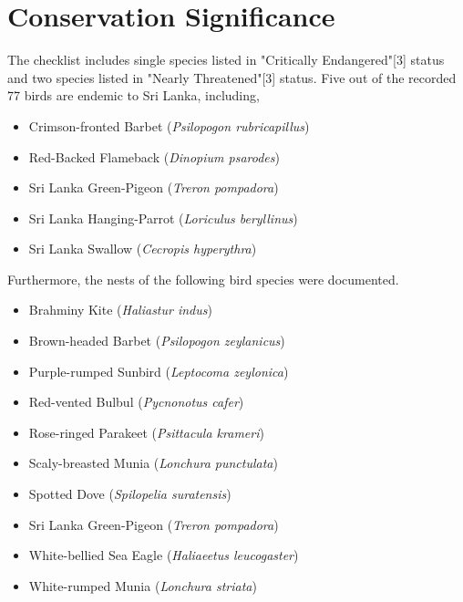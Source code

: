 \section{Conservation Significance}
The checklist includes single species listed in "Critically Endangered"[3] status and two species listed in "Nearly Threatened"[3] status. Five out of the recorded 77 birds are endemic to Sri Lanka, including,
\begin{itemize}
\item Crimson-fronted Barbet (\textit{Psilopogon rubricapillus})
\item Red{-}Backed Flameback (\textit{Dinopium psarodes})
\item Sri Lanka Green-Pigeon (\textit{Treron pompadora})
 \item Sri Lanka Hanging-Parrot (\textit{Loriculus beryllinus})
   \item Sri Lanka Swallow (\textit{Cecropis hyperythra})
\end{itemize}
Furthermore, the nests of the following bird species were documented.
\begin{itemize}
\item Brahminy Kite (\textit{Haliastur indus})
\item Brown-headed Barbet (\textit{Psilopogon zeylanicus})
\item Purple-rumped Sunbird (\textit{Leptocoma zeylonica})
\item Red-vented Bulbul (\textit{Pycnonotus cafer})
\item Rose-ringed Parakeet (\textit{Psittacula krameri})
\item Scaly-breasted Munia (\textit{Lonchura punctulata})
\item Spotted Dove (\textit{Spilopelia suratensis})
\item Sri Lanka Green-Pigeon (\textit{Treron pompadora})
\item White-bellied Sea Eagle (\textit{Haliaeetus leucogaster})
\item White-rumped Munia (\textit{Lonchura striata})
\end{itemize}
